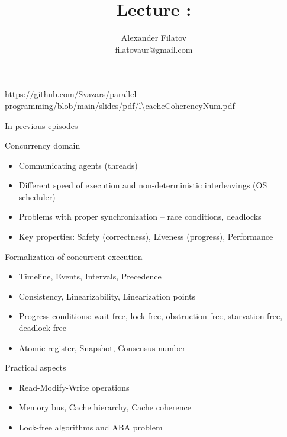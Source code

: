 


\newcommand{\thisLectureNum}{\cacheCoherencyNum}

\title[]{Lecture \thisLectureNum: \cacheCoherencyTopic}
\subtitle[]{\cacheCoherencyKey}

\author[]{Alexander Filatov\\ filatovaur@gmail.com}
\date{}



\begin{frame}
  \titlepage
  \url{https://github.com/Svazars/parallel-programming/blob/main/slides/pdf/l\thisLectureNum.pdf}
\end{frame}


\begin{frame}{In previous episodes}

Concurrency domain
\begin{itemize}
 \item Communicating agents (threads)
 \item Different speed of execution and non-deterministic interleavings (OS scheduler)
 \item Problems with proper synchronization -- race conditions, deadlocks
 \item Key properties: Safety (correctness), Liveness (progress), Performance
\end{itemize}

Formalization of concurrent execution
\begin{itemize}
 \item Timeline, Events, Intervals, Precedence
 \item Consistency, Linearizability, Linearization points
 \item Progress conditions: wait-free, lock-free, obstruction-free, starvation-free, deadlock-free
 \item Atomic register, Snapshot, Consensus number
\end{itemize}

Practical aspects
\begin{itemize}
 \item Read-Modify-Write operations
 \item Memory bus, Cache hierarchy, Cache coherence
 \item Lock-free algorithms and ABA problem
\end{itemize}
\end{frame}

